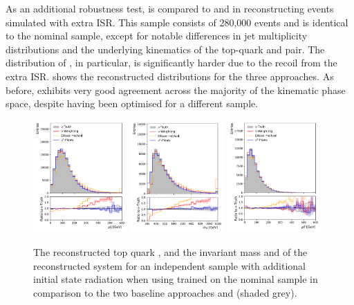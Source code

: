 As an additional robustness test, \vvflows is compared to \vweight and \ellipse in reconstructing \ttbar events simulated with extra ISR.
This sample consists of 280,000 events and is identical to the nominal sample, except for notable differences in jet multiplicity distributions and the underlying kinematics of the top-quark and \ttbar pair.
The distribution of \pttt, in particular, is significantly harder due to the recoil from the extra ISR.
 shows the reconstructed distributions for the three approaches.
As before, \vvflows exhibits very good agreement across the majority of the kinematic phase space, despite having been optimised for a different sample.

\begin{figure}[htbp]
    \centering
    \includegraphics[width=0.32\textwidth]{Figures/neutrino_unfolding/extraISR/topanti_top_pt.pdf}
    \includegraphics[width=0.32\textwidth]{Figures/neutrino_unfolding/extraISR/ttbar_m.pdf}
    \includegraphics[width=0.32\textwidth]{Figures/neutrino_unfolding/extraISR/ttbar_pt.pdf}
    \caption{The reconstructed top quark \pt, and the invariant mass and \pt of the reconstructed \ttbar system for an independent sample with additional initial state radiation when using \vvflows trained on the nominal sample in comparison to the two baseline approaches and \vtruth (shaded grey).
    }
    \label{fig:extraISRttbar}
\end{figure}

